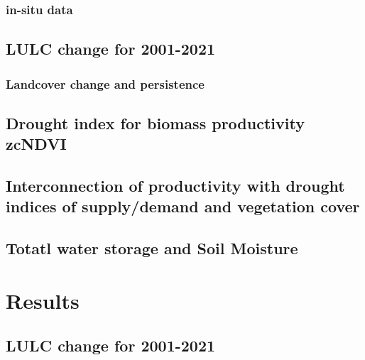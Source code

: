 \documentclass[preprint,
3p]{elsarticle} %
\begin{document}
\hypertarget{in-situ-data}{%
\subsubsection{in-situ data}\label{in-situ-data}}

\hypertarget{lulc-change-for-2001-2021}{%
\subsection{LULC change for 2001-2021}\label{lulc-change-for-2001-2021}}

\hypertarget{landcover-change-and-persistence}{%
\subsubsection{Landcover change and
persistence}\label{landcover-change-and-persistence}}

\hypertarget{drought-index-for-biomass-productivity-zcndvi}{%
\subsection{Drought index for biomass productivity
zcNDVI}\label{drought-index-for-biomass-productivity-zcndvi}}

\hypertarget{interconnection-of-productivity-with-drought-indices-of-supplydemand-and-vegetation-cover}{%
\subsection{Interconnection of productivity with drought indices of
supply/demand and vegetation
cover}\label{interconnection-of-productivity-with-drought-indices-of-supplydemand-and-vegetation-cover}}

\hypertarget{totatl-water-storage-and-soil-moisture}{%
\subsection{Totatl water storage and Soil
Moisture}\label{totatl-water-storage-and-soil-moisture}}

\hypertarget{results}{%
\section{Results}\label{results}}

\hypertarget{lulc-change-for-2001-2021-1}{%
\subsection{LULC change for
2001-2021}\label{lulc-change-for-2001-2021-1}}
\end{document}
